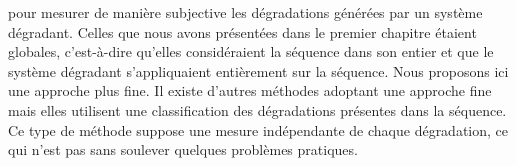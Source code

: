 
 pour mesurer de manière subjective les dégradations générées par un système dégradant. Celles que nous avons présentées dans le premier chapitre étaient globales, c'est-à-dire qu'elles considéraient la séquence dans son entier et que le système dégradant s'appliquaient entièrement sur la séquence. Nous proposons ici une approche plus fine. Il existe d'autres méthodes adoptant une approche fine~\cite{farias-phd,eusipco2006-wolff} mais elles utilisent une classification des dégradations présentes dans la séquence. Ce type de méthode suppose une mesure indépendante de chaque dégradation, ce qui n'est pas sans soulever quelques problèmes pratiques.

